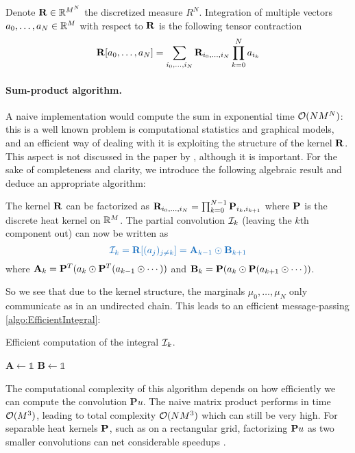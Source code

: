 \documentclass[../report.tex]{subfiles}
\begin{document}
Denote $\mathbf{R} \in \mathbb{R}^{M^N}$ the discretized measure $R^N$. Integration of multiple vectors $a_0,\ldots,a_N\in\mathbb{R}^M$ with respect to $\mathbf{R}$ is the following tensor contraction
\[
	\mathbf{R}[a_0, \ldots, a_N] =
	\sum_{i_0,\ldots,i_N} \mathbf{R}_{i_0,\ldots,i_N}\prod_{k=0}^N a_{i_k}
\]

\paragraph{Sum-product algorithm.} A naive implementation would compute the sum in exponential time $\mathcal{O}(NM^N)$: this is a well known problem is computational statistics and graphical models, and an efficient way of dealing with it is exploiting the structure of the kernel $\mathbf{R}$. This aspect is not discussed in the paper by \textcite{benamou:hal-01295299}, although it is important. For the sake of completeness and clarity, we introduce the following algebraic result and deduce an appropriate algorithm:

\begin{prop}\label{prop:efficientConvol}
The kernel $\mathbf{R}$ can be factorized as $\mathbf{R}_{i_0,\ldots,i_N} = \prod_{k=0}^{N-1} \mathbf{P}_{i_k,i_{k+1}}$ where $\mathbf{P}$ is the discrete heat kernel on $\mathbb{R}^M$. The partial convolution $\mathcal{I}_k$ (leaving the $k$th component out) can now be written as
\begin{equation}
{\bluefont
	\calI_k = \bfR[(a_j)_{j\neq k}] =
	\mathbf{A}_{k-1} \odot \mathbf{B}_{k+1}
}
\end{equation}
where $\mathbf{A}_{k} = \mathbf{P}^T (a_k \odot \mathbf{P}^T(a_{k-1} \odot \cdots))$ and $\mathbf{B}_k = \mathbf{P} (a_k \odot \mathbf{P} (a_{k+1}\odot \cdots))$.
\end{prop}
So we see that due to the kernel structure, the marginals $\mu_0,\ldots,\mu_N$ only communicate as in an undirected chain. This leads to an efficient message-passing \cref{algo:EfficientIntegral}:
\begin{algorithm}[h]
\caption{Efficient computation of the integral $\mathcal{I}_k$.}\label{algo:EfficientIntegral}
$\mathbf{A} \leftarrow \mathds{1}$\;
$\mathbf{B} \leftarrow \mathds{1}$\;
\;
\end{algorithm}

The computational complexity of this algorithm depends on how efficiently we can compute the convolution $\mathbf{P}u$. The naive matrix product performs in time $\mathcal{O}(M^3)$, leading to total complexity $\mathcal{O}(NM^3)$ which can still be very high. For separable heat kernels $\mathbf{P}$, such as on a rectangular grid, factorizing $\mathbf{P} u$ as two smaller convolutions can net considerable speedups \parencite[p.~74]{peyr2018computational}.
\end{document}

